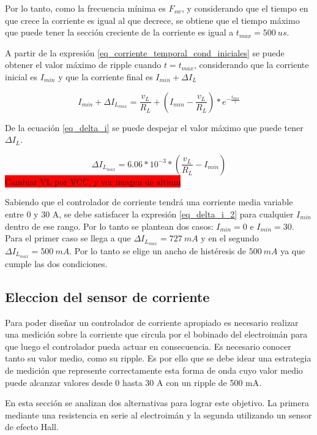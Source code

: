 Por lo tanto, como la frecuencia mínima es $F_{sw}$, y considerando que el tiempo en que crece la corriente es igual al que decrece, se obtiene que el tiempo máximo que puede tener la sección creciente de la corriente es igual a $t_{max}=500\:us$. 

A partir de la expresión \ref{eq_corriente_temporal_cond_iniciales} se puede obtener el valor máximo de ripple cuando $t=t_{max}$, considerando que la corriente inicial es $I_{min}$ y que la corriente final es $I_{min}+\Delta I_L$

\begin{equation} \label{eq_delta_i}
	I_{min}+\Delta I_{L_{max}}=\frac{v_L}{R_L}+(I_{min}-\frac{v_L}{R_L})*e^{-\frac{t_{max}}{\tau}}
\end{equation}

De la ecuación \ref{eq_delta_i} se puede despejar el valor máximo que puede tener $\Delta I_L$. 

\begin{equation} \label{eq_delta_i_2}
	\Delta I_{L_{max}}=6.06*10^{-3}*(\frac{v_L}{R_L}-I_{min})
\end{equation}
\colorbox{red}{Cambiar VL por VCC, y ver imagen de altium}

Sabiendo que el controlador de corriente tendrá una corriente media variable entre 0 y 30 A, se debe satisfacer la expresión \ref{eq_delta_i_2} para cualquier $I_{min}$ dentro de ese rango. Por lo tanto se plantean dos casos: $I_{min}=0$ e $I_{min}=30$. Para el primer caso se llega a que $\Delta I_{L_{max}}=727\:mA$ y en el segundo $\Delta I_{L_{max}}=500\:mA$. Por lo tanto se elige un ancho de histéresis de $500\:mA$ ya que cumple las dos condiciones.

\subsection{Eleccion del sensor de corriente}

Para poder diseñar un controlador de corriente apropiado es necesario realizar una medición sobre la corriente que circula por el bobinado del electroimán para que luego el controlador pueda actuar en consecuencia. Es necesario conocer tanto su valor medio, como su ripple. Es por ello que se debe idear una estrategia de medición que represente correctamente esta forma de onda cuyo valor medio puede alcanzar valores desde 0 hasta 30 A con un ripple de 500 mA.

En esta sección se analizan dos alternativas para lograr este objetivo. La primera mediante una resistencia en serie al electroimán y la segunda utilizando un sensor de efecto Hall.


